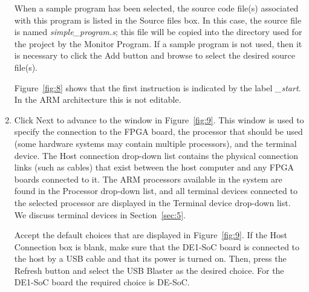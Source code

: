 \documentclass[11pt, twoside, pdftex]{article}
\begin{document}
\begin{enumerate}
\newpage 
When a sample program has been
selected, the source code file(s) associated with this program
is listed in the {\sf Source files} box.  In this case, the source file is named {\it simple\_program.s}; this
file will be copied into the directory used for the project by
the Monitor Program. 
If a sample program is not used, then it is necessary to click
the {\sf Add} button and browse to select the desired source 
file(s).

Figure~\ref{fig:8} shows that the first instruction is indicated
by the label {\it \_start}. In the ARM architecture this is not editable.

\item 
Click {\sf Next} to advance to the window in Figure~\ref{fig:9}.
This window is used to specify the connection to the FPGA board, the processor that should be used (some hardware systems may
contain multiple processors), and the terminal device.
The {\sf Host connection} drop-down list contains the physical
connection links (such as cables) that exist between the host computer and any FPGA boards connected to it. 
The ARM processors available in the system are found in the 
{\sf Processor} drop-down list, and all 
terminal devices connected to the selected processor are displayed in the {\sf Terminal device} drop-down list. 
We discuss terminal devices in Section~\ref{sec:5}.

Accept the default choices that are displayed in Figure~\ref{fig:9}. If the Host Connection box is blank, make sure that 
the DE1-SoC board is connected to the host by a USB cable and
that its power is turned on. Then, press the {\sf Refresh} button and select the USB Blaster as the desired choice.
For the DE1-SoC board the required choice is DE-SoC.


\end{enumerate}
\end{document}
